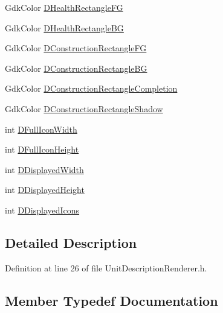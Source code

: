 \begin{DoxyCompactItemize}
\item 
Gdk\+Color \hyperlink{classCUnitDescriptionRenderer_a0853b06022be60337a5015efb90666bd}{D\+Health\+Rectangle\+FG}
\item 
Gdk\+Color \hyperlink{classCUnitDescriptionRenderer_ac3f81e657b619785c3babd9026b7c6d2}{D\+Health\+Rectangle\+BG}
\item 
Gdk\+Color \hyperlink{classCUnitDescriptionRenderer_a2f4f541a008668f1b8fc55500443c1a3}{D\+Construction\+Rectangle\+FG}
\item 
Gdk\+Color \hyperlink{classCUnitDescriptionRenderer_a7a763ac1aec2ee9d3b70694e1fbe4f9d}{D\+Construction\+Rectangle\+BG}
\item 
Gdk\+Color \hyperlink{classCUnitDescriptionRenderer_a6a512a78402b31fefb80794af96c1912}{D\+Construction\+Rectangle\+Completion}
\item 
Gdk\+Color \hyperlink{classCUnitDescriptionRenderer_a8e19ce3520d89f775dc5de84c2985221}{D\+Construction\+Rectangle\+Shadow}
\item 
int \hyperlink{classCUnitDescriptionRenderer_a4bd79032fe13b9c09386a24cb8ef7650}{D\+Full\+Icon\+Width}
\item 
int \hyperlink{classCUnitDescriptionRenderer_ae9f7d843d0eabd4b1f1b19bfa5332754}{D\+Full\+Icon\+Height}
\item 
int \hyperlink{classCUnitDescriptionRenderer_a4c472ecc82b5956fc65aeebb2faf17fd}{D\+Displayed\+Width}
\item 
int \hyperlink{classCUnitDescriptionRenderer_acc5f08d377a050f778614561a0b12a6c}{D\+Displayed\+Height}
\item 
int \hyperlink{classCUnitDescriptionRenderer_a0f2d234d02c615ac28812508c77ec414}{D\+Displayed\+Icons}
\end{DoxyCompactItemize}


\subsection{Detailed Description}


Definition at line 26 of file Unit\+Description\+Renderer.\+h.



\subsection{Member Typedef Documentation}
\hypertarget{classCUnitDescriptionRenderer_a80d47a4b8bb5558bff5db296b614dd75}{}\label{classCUnitDescriptionRenderer_a80d47a4b8bb5558bff5db296b614dd75} 
